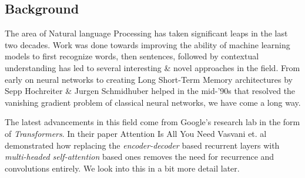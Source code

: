 \documentclass[11pt]{article}
\begin{document}
	\subsection{Background}\label{back}
	The area of Natural language Processing has taken significant leaps in the last two decades. Work was done towards improving the ability of machine learning models to first recognize words, then sentences, followed by contextual understanding has led to several interesting \& novel approaches in the field. From early on neural networks to creating Long Short-Term Memory architectures\citep{originallstm} by Sepp Hochreiter \& Jurgen Schmidhuber helped in the mid-'90s that resolved the vanishing gradient problem of classical neural networks, we have come a long way.
	
	The latest advancements in this field come from Google's research lab in the form of \textit{Transformers}. In their paper Attention Is All You Need\citep{atayl} Vasvani et. al demonstrated how replacing the \textit{encoder-decoder} based recurrent layers with \textit{multi-headed self-attention} based ones removes the need for recurrence and convolutions entirely. We look into this in a bit more detail later.\\
	
	
\end{document}
